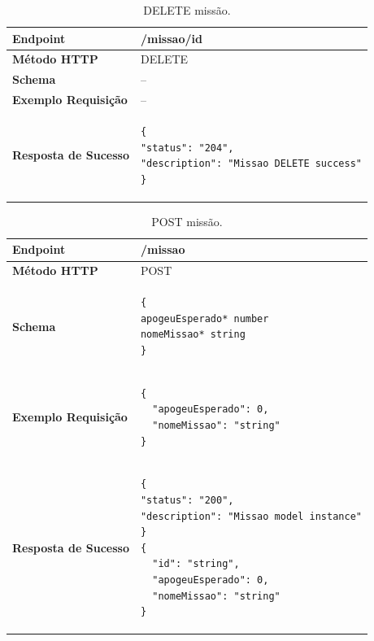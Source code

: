 \begin{apendicesenv}
\begin{table}[H]
\begin{tabular}{|l|l|}
\hline
\textbf{Endpoint}            & /missao/{id} \\ \hline
\textbf{Método HTTP}         & DELETE \\ \hline
\textbf{Schema}              & -- \\ \hline
\textbf{Exemplo Requisição}  & -- \\ \hline
\textbf{Resposta de Sucesso} &
\begin{lstlisting}
{
"status": "204",
"description": "Missao DELETE success"
}
\end{lstlisting}
\\ \hline
\end{tabular}
\caption{DELETE missão.}
\label{delete_missao}
\end{table}


\begin{table}[H]
\begin{tabular}{|l|l|}
\hline
\textbf{Endpoint}            & /missao \\ \hline
\textbf{Método HTTP}         & POST \\ \hline
\textbf{Schema}              & 
\begin{lstlisting}
{
apogeuEsperado*	number
nomeMissao*	string
}
\end{lstlisting} \\ \hline
\textbf{Exemplo Requisição}  & 
\begin{lstlisting}
{
  "apogeuEsperado": 0,
  "nomeMissao": "string"
}
\end{lstlisting} \\ \hline
\textbf{Resposta de Sucesso} &
\begin{lstlisting}
{
"status": "200",
"description": "Missao model instance"
}
{
  "id": "string",
  "apogeuEsperado": 0,
  "nomeMissao": "string"
}
\end{lstlisting}
\\ \hline
\end{tabular}
\caption{POST missão.}
\label{post_missao}
\end{table}



\end{apendicesenv}
